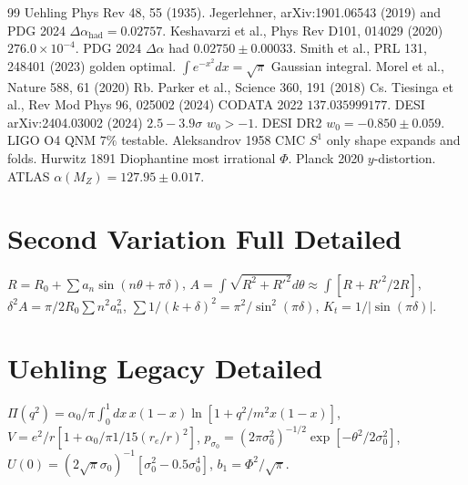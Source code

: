 \documentclass[11pt,a4paper]{article}
\begin{document}
\begin{thebibliography}{99}
 Uehling Phys Rev 48, 55 (1935).
 Jegerlehner, arXiv:1901.06543 (2019) and PDG 2024 $\Delta\alpha_{\text{had}}=0.02757$.
 Keshavarzi et al., Phys Rev D101, 014029 (2020) $276.0\times10^{-4}$.
 PDG 2024 $\Delta\alpha$ had $0.02750\pm0.00033$.
 Smith et al., PRL 131, 248401 (2023) golden optimal.
 $\int e^{-x^2}dx=\sqrt\pi$ Gaussian integral.
 Morel et al., Nature 588, 61 (2020) Rb.
 Parker et al., Science 360, 191 (2018) Cs.
 Tiesinga et al., Rev Mod Phys 96, 025002 (2024) CODATA 2022 $137.035999177$.
 DESI arXiv:2404.03002 (2024) $2.5-3.9\sigma$ $w_0>-1$.
 DESI DR2 $w_0=-0.850\pm0.059$.
 LIGO O4 QNM $7\%$ testable.
 Aleksandrov 1958 CMC $S^1$ only shape expands and folds.
 Hurwitz 1891 Diophantine most irrational $\Phi$.
 Planck 2020 $y$-distortion.
 ATLAS $\alpha(M_Z)=127.95\pm0.017$.
\end{thebibliography}
\appendix
\section{Second Variation Full Detailed}
$R=R_0+\sum a_n\sin(n\theta+\pi\delta)$, $A=\int\sqrt{R^2+R'^2}d\theta\approx\int[R+R'^2/2R]$, $\delta^2A=\pi/2R_0\sum n^2a_n^2$, $\sum1/(k+\delta)^2=\pi^2/\sin^2(\pi\delta)$, $K_t=1/|\sin(\pi\delta)|$.

\section{Uehling Legacy Detailed}
$\Pi(q^2)=\alpha_0/\pi\int_0^1dx\,x(1-x)\ln[1+q^2/m^2x(1-x)]$, $V=e^2/r[1+\alpha_0/\pi1/15(r_e/r)^2]$, $p_{\sigma_0}=(2\pi\sigma_0^2)^{-1/2}\exp[-\theta^2/2\sigma_0^2]$, $U(0)=(2\sqrt\pi\sigma_0)^{-1}[\sigma_0^2-0.5\sigma_0^4]$, $b_1=\Phi^2/\sqrt\pi$.
\end{document}
